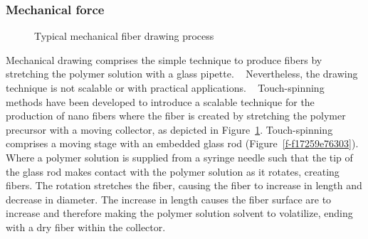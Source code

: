 \documentclass[5p,,preprint,12pt,twocolumn]{elsarticle}
\makeatletter
\def\fixFloatSize#1{}%
\makeatother
\begin{document}
\subsubsection{Mechanical force}
\bgroup
\fixFloatSize{images/23a9bc42-4d02-4a78-a907-23aeeb2de68a-uimg_meches_process.png}
\begin{figure}[!htbp]
\centering \makeatletter{}
\makeatother 
\caption{{Typical mechanical fiber drawing process}}
\label{f-432d16f420fb}
\end{figure}
\egroup
Mechanical drawing comprises the simple technique to produce fibers by stretching the polymer solution with a glass pipette. \unskip~\cite{527120:14024998} Nevertheless, the drawing technique is not scalable or with practical applications. \unskip~\cite{527120:14025041} Touch-spinning methods have been developed to introduce a scalable technique for the production of nano fibers where the fiber is created by stretching the polymer precursor with a moving collector, as depicted in Figure~\ref{f-432d16f420fb}. Touch-spinning comprises a moving stage with an embedded glass rod (Figure~\ref{f-f17259e76303}). Where a polymer solution is supplied from a syringe needle such that the tip of the glass rod makes contact with the polymer solution as it rotates, creating fibers. The rotation stretches the fiber, causing the fiber to increase in length and decrease in diameter. The increase in length causes the fiber surface are to increase and therefore making the polymer solution solvent to volatilize, ending with a dry fiber within the collector.
\end{document}
